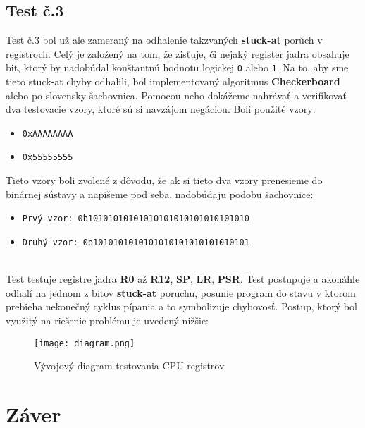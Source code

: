 \documentclass[11pt,a4paper]{article}
\begin{document}
    \subsection{Test č.3}
        \indent \hypertarget{label}{Test č.3} bol už ale zameraný na odhalenie takzvaných \textbf{stuck-at} porúch v registroch. Celý je založený na tom, že zisťuje, či nejaký register jadra obsahuje bit, ktorý by nadobúdal konštantnú hodnotu logickej \texttt{0} alebo \texttt{1}. Na to, aby sme tieto stuck-at chyby odhalili, bol implementovaný algoritmus \textbf{Checkerboard} alebo po slovensky šachovnica. Pomocou neho dokážeme nahrávať a verifikovať dva testovacie vzory, ktoré sú si navzájom negáciou. Boli použité vzory:
        \begin{itemize}
        \item \texttt{0xAAAAAAAA}
        \item \texttt{0x55555555}
        \end{itemize}
        Tieto vzory boli zvolené z dôvodu, že ak si tieto dva vzory prenesieme do binárnej sústavy a napíšeme pod seba, nadobúdaju podobu šachovnice:\\
        \begin{itemize}
        \item \texttt{Prvý vzor: \texttt{0b10101010101010101010101010101010}}
        \item \texttt{Druhý vzor: \texttt{0b1010101010101010101010101010101}}
        \end{itemize}\\
        \indent Test testuje registre jadra \textbf{R0} až \textbf{R12}, \textbf{SP}, \textbf{LR}, \textbf{PSR}. Test postupuje a akonáhle odhalí na jednom z bitov \textbf{stuck-at} poruchu, posunie program do stavu v ktorom prebieha nekonečný cyklus pípania a to symbolizuje chybovosť. Postup, ktorý bol využitý na riešenie problému je uvedený nižšie:
        \begin{figure*}[h]
        \centering
        \texttt{[image: diagram.png]}
        \caption{Vývojový diagram testovania CPU registrov}
        \end{figure*}
        
    
\newpage

\section{Záver}
\end{document}
